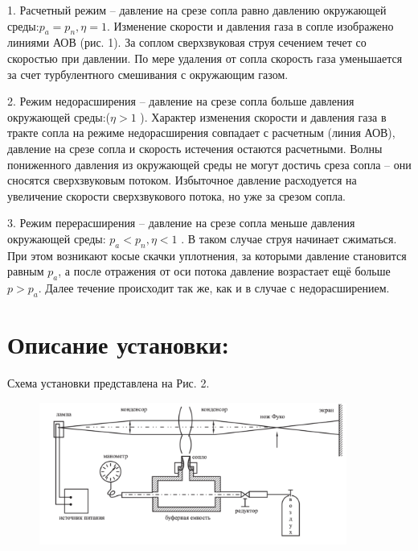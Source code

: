 \documentclass[a4paper]{article}
\begin{document}
\begin{minipage}{0.6\textwidth}\raggedright
1. Расчетный режим – давление на срезе сопла равно давлению окружающей среды:$p_a = p_n, \eta = 1$. Изменение скорости и давления газа в сопле изображено линиями АОВ (рис. 1). За соплом сверхзвуковая струя сечением   течет со скоростью при давлении. По мере удаления от сопла скорость газа уменьшается за счет турбулентного смешивания с окружающим газом.
\par
2. Режим недорасширения – давление на срезе сопла больше давления окружающей среды:($\eta > 1$ ). Характер изменения скорости и давления газа в тракте сопла на режиме недорасширения совпадает с расчетным (линия АОВ), давление на срезе сопла и скорость истечения остаются расчетными. Волны пониженного давления из окружающей среды не могут достичь среза сопла – они сносятся сверхзвуковым потоком. Избыточное давление   расходуется на увеличение скорости сверхзвукового потока, но уже за срезом сопла.

\par
3. Режим перерасширения – давление на срезе сопла меньше давления окружающей среды: $p_a < p_n, \eta < 1$  . В таком случае струя начинает сжиматься. При этом возникают косые скачки уплотнения, за которыми давление становится равным $p_a$, а после отражения от оси потока давление возрастает ещё больше $p > p_a$. Далее течение происходит так же, как и в случае с недорасширением.
\end{minipage}










\newpage
\section*{Описание установки:}

Схема установки представлена на Рис. 2. 

\begin {figure}[H]
\begin{center}
\includegraphics[width=0.9\textwidth]{scheme.png}
\end{center}
\end {figure}
\end{document}
